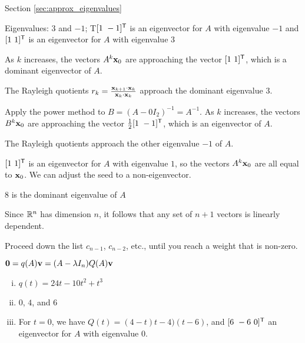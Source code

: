 \begin{multicols}{2}
\hspace{-0.25in} Section \ref{sec:approx_eigenvalues}

\obe
\item 
\ba
\item Eigenvalues: $3$ and $-1$; T$[1 \ -1]^{\mathsf{T}}$ is an eigenvector for $A$ with eigenvalue $-1$ and $[1 \ 1]^{\mathsf{T}}$ is an eigenvector for $A$ with eigenvalue $3$

\item As $k$ increases, the vectors $A^k \mathbf{x}_0$ are approaching the vector $[1 \ 1]^{\mathsf{T}}$, which is a dominant eigenvector of $A$.

\item The Rayleigh quotients $r_k = \frac{\mathbf{x}_{k+1}\cdot \mathbf{x}_k}{\mathbf{x}_k \cdot \mathbf{x}_k}$ approach the dominant eigenvalue $3$. 

\item Apply the power method to $B = (A - 0 I_2)^{-1} = A^{-1}$. As $k$ increases, the vectors $B^k \mathbf{x}_0$ are approaching the vector $ \frac{1}{2}[1 \ -1]^{\tr}$, which is an eigenvector of $A$.

The Rayleigh quotients approach the other eigenvalue $-1$ of $A$. 

\ea

\item $[1 \ 1]^{\mathsf{T}}$ is an eigenvector for $A$ with eigenvalue $1$, so the vectors $A^k \mathbf{x}_0$ are all equal to $\mathbf{x}_0$. We can adjust the seed to a non-eigenvector.

\item  $8$ is the dominant eigenvalue of $A$

\item 
\ba
\item Since $\mathbb{R}^n$ has dimension $n$, it follows that any set of $n+1$ vectors is linearly dependent.

\item Proceed down the list $c_{n-1}$, $c_{n-2}$, etc., until you reach a weight that is non-zero.

\item $\mathbf{0} = q(A) \mathbf{v} = (A-\lambda I_n) Q(A)\mathbf{v}$


\item 
	\begin{enumerate}[i.]
	\item $q(t) = 24t - 10t^2+t^3$
	\item $0$, $4$, and $6$ 
	\item For $t=0$, we have $Q(t) = (4-t)t-4)(t-6)$, and $[6 \ -6 \ 0]^{\mathsf{T}}$ an eigenvector for $A$ with eigenvalue $0$.
	

\end{enumerate}
\end{multicols}

